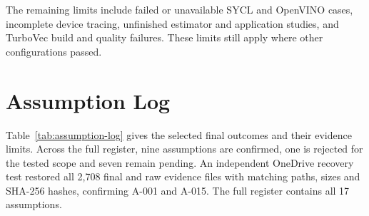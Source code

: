 The remaining limits include failed or unavailable SYCL and OpenVINO cases,
incomplete device tracing, unfinished estimator and application studies, and
TurboVec build and quality failures. These limits still apply where other
configurations passed.

\section{Assumption Log}

Table~\ref{tab:assumption-log} gives the selected final outcomes and their
evidence limits. Across the full register, nine assumptions are confirmed, one
is rejected for the tested scope and seven remain pending. An independent
OneDrive recovery test restored all 2,708 final and raw evidence files with
matching paths, sizes and SHA-256 hashes, confirming A-001 and A-015. The full
register contains all 17 assumptions.

